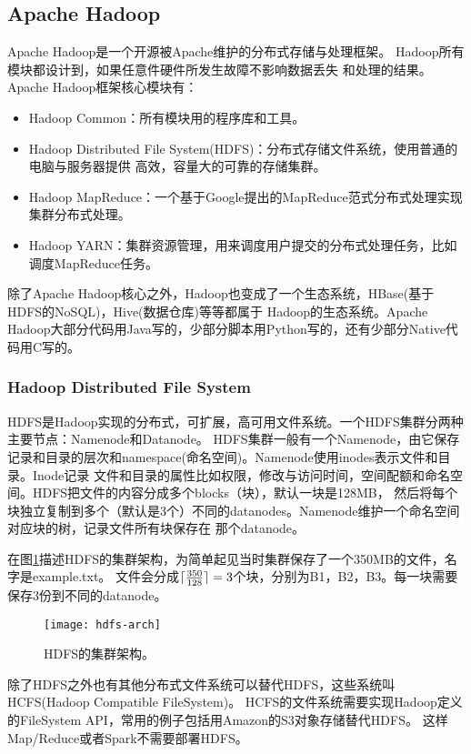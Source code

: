 \subsection{Apache Hadoop}
\label{subsubsec:hadoop}
Apache Hadoop是一个开源被Apache维护的分布式存储与处理框架。
Hadoop所有模块都设计到，如果任意件硬件所发生故障不影响数据丢失
和处理的结果。
Apache Hadoop框架核心模块有：
\begin{itemize}
  \item Hadoop Common：所有模块用的程序库和工具。
  \item Hadoop Distributed File System(HDFS)：分布式存储文件系统，使用普通的电脑与服务器提供
        高效，容量大的可靠的存储集群。
  \item Hadoop MapReduce：一个基于Google提出的MapReduce范式分布式处理实现集群分布式处理。
  \item Hadoop YARN：集群资源管理，用来调度用户提交的分布式处理任务，比如调度MapReduce任务。
\end{itemize}
除了Apache Hadoop核心之外，Hadoop也变成了一个生态系统，HBase(基于HDFS的NoSQL)，Hive(数据仓库)等等都属于
Hadoop的生态系统。Apache Hadoop大部分代码用Java写的，少部分脚本用Python写的，还有少部分Native代码用C写的。

\subsubsection{Hadoop Distributed File System}
\label{subsubsec:hdfs}
HDFS是Hadoop实现的分布式，可扩展，高可用文件系统。一个HDFS集群分两种主要节点：Namenode和Datanode。
HDFS集群一般有一个Namenode，由它保存记录和目录的层次和namespace(命名空间)。Namenode使用inodes表示文件和目录。Inode记录
文件和目录的属性比如权限，修改与访问时间，空间配额和命名空间。HDFS把文件的内容分成多个blocks（块），默认一块是128MB，
然后将每个块独立复制到多个（默认是3个）不同的datanodes。Namenode维护一个命名空间对应块的树，记录文件所有块保存在
那个datanode。

在图\ref{fig:hdfs-arch}描述HDFS的集群架构，为简单起见当时集群保存了一个350MB的文件，名字是example.txt。
文件会分成$\lceil\frac{350}{128}\rceil = 3$个块，分别为B1，B2，B3。每一块需要保存3份到不同的datanode。

\begin{figure}
  \centering
    \texttt{[image: hdfs-arch]}
    \caption{HDFS的集群架构。}
  \label{fig:hdfs-arch}
\end{figure}

除了HDFS之外也有其他分布式文件系统可以替代HDFS，这些系统叫HCFS(Hadoop Compatible FileSystem)。
HCFS的文件系统需要实现Hadoop定义的FileSystem API，常用的例子包括用Amazon的S3对象存储替代HDFS。
这样Map/Reduce或者Spark不需要部署HDFS。


